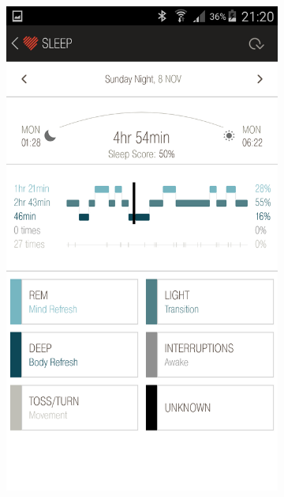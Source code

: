\documentclass[12pt,a4paper]{article}
\begin{document}
\begin{figure}[H]
    \begin{subfigure}[b]{0.5\textwidth}
        \includegraphics[width=\textwidth]{08-11-15.png}
     \end{subfigure}
    ~ %
    \begin{subfigure}[b]{0.5\textwidth}

\end{subfigure}
\end{figure}
\end{document}
